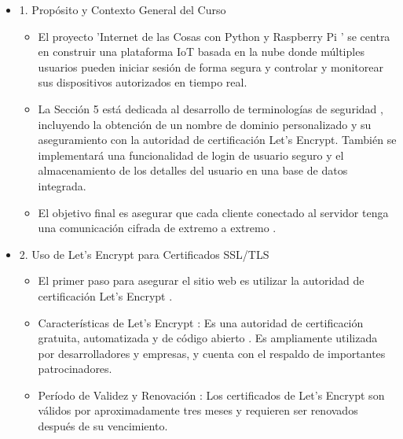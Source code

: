 \documentclass{report}
\begin{document}
\begin{itemize}
    \item 1. Propósito y Contexto General del Curso
    \begin{itemize}
        \item El proyecto  'Internet de las Cosas con Python y Raspberry Pi ' se centra en construir una  plataforma IoT basada en la nube  donde 
        múltiples usuarios pueden iniciar sesión de forma segura y controlar y monitorear sus dispositivos autorizados en tiempo real.
        \item La Sección 5 está dedicada al  desarrollo de terminologías de seguridad , incluyendo la obtención de un nombre de dominio personalizado 
        y su aseguramiento con la autoridad de certificación Let's Encrypt. También se implementará una funcionalidad de login de usuario seguro y el 
        almacenamiento de los detalles del usuario en una base de datos integrada.
        \item El objetivo final es asegurar que cada cliente conectado al servidor tenga una  comunicación cifrada de extremo a extremo .
    \end{itemize}

    \item 2. Uso de Let's Encrypt para Certificados SSL/TLS
    \begin{itemize}
        \item El primer paso para asegurar el sitio web es utilizar la  autoridad de certificación Let's Encrypt .
        \item Características de Let's Encrypt : Es una autoridad de certificación  gratuita, automatizada y de código abierto . Es ampliamente 
        utilizada por desarrolladores y empresas, y cuenta con el respaldo de importantes patrocinadores.
        \item Período de Validez y Renovación : Los certificados de Let's Encrypt son  válidos por aproximadamente tres meses  y requieren ser 
        renovados después de su vencimiento.
    \end{itemize}


\end{itemize}
\end{document}

